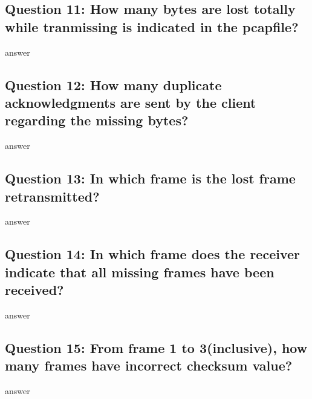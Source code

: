 \documentclass[11pt, oneside, a4paper]{article}
\begin{document}
\subsection*{Question 11: How many bytes are lost totally while tranmissing is indicated in the pcapfile?}
answer

\subsection*{Question 12: How  many  duplicate  acknowledgments  are  sent  by  the  client  regarding the missing bytes?}
answer

\subsection*{Question 13: In which frame is the lost frame retransmitted?}
answer

\subsection*{Question 14: In  which  frame  does  the  receiver  indicate  that all  missing  frames  have  been received?}
answer

\subsection*{Question 15: From frame 1 to 3(inclusive), how many frames have incorrect checksum value?}
answer
\end{document}
